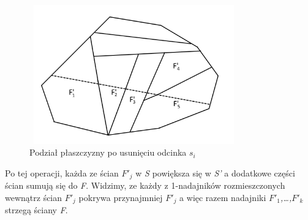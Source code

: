 \documentclass[brudnopis]{xmgr}
\begin{document}
\begin{figure}[ht!]
  \centering
  \label{podzial po usunieciu si}
  \includegraphics[width=9cm,height=6cm]{rysunki/usuniete_si.png}
  \caption{Podział płaszczyzny po usunięciu odcinka $s_i$}
\end{figure} 

Po tej operacji, każda ze ścian \textit{$F'_j$} w \textit{S} powiększa się w \textit{S'} a dodatkowe części ścian sumują się do \textit{F}. Widzimy, ze każdy z 1-nadajników rozmieszczonych wewnątrz ścian \textit{$F'_j$} pokrywa przynajmniej \textit{$F'_j$} a więc razem nadajniki \textit{$F'_1$,\ldots,$F'_k$} strzegą ściany \textit{F}.
\end{document}
